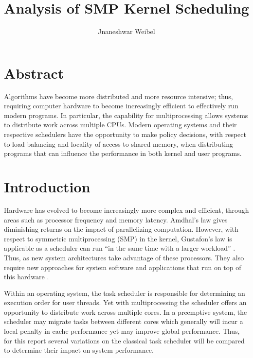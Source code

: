 \documentclass[11pt]{article}
\title{Analysis of SMP Kernel Scheduling}
\author{Jnaneshwar Weibel}
\begin{document}
\maketitle

\section*{Abstract}
\label{sec:abstract}
Algorithms have become more distributed and more resource intensive; thus, requiring computer hardware to become increasingly efficient to effectively run modern programs.  In particular, the capability for multiprocessing allows systems to distribute work across multiple CPUs.  Modern operating systems and their respective schedulers have the opportunity to make policy decisions, with respect to load balancing and locality of access to shared memory, when distributing programs that can influence the performance in both kernel and user programs.



\section{Introduction}
\label{sec:introduction}
Hardware has evolved to become increasingly more complex and efficient, through areas such as processor frequency and memory latency.  Amdhal's law gives diminishing returns on the impact of parallelizing computation.  However, with respect to symmetric multiprocessing (SMP) in the kernel, Gustafon's law is applicable as a scheduler can run ``in the same time with a larger workload'' \cite{gustafon}.  Thus, as new system architectures take advantage of these processors.  They also require new approaches for system software and applications that run on top of this hardware \cite{nitrd}.

Within an operating system, the task scheduler is responsible for determining an execution order for user threads.  Yet with multiprocessing the scheduler offers an opportunity to distribute work across multiple cores.  In a preemptive system, the scheduler may migrate tasks between different cores which generally will incur a local penalty in cache performance yet may improve global performance.  Thus, for this report several variations on the classical task scheduler will be compared to determine their impact on system performance.
\end{document}
